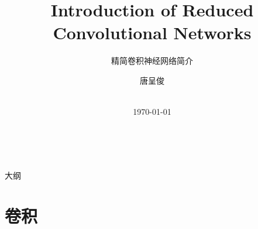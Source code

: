 \documentclass[UTF8, fontset=founder, aspectratio=43, 10pt, t]{ctexbeamer}
\begin{document}
	


\newcommand{\balA}[1][1]{BAL$^\mathup{I}_{#1:#1}$\xspace}
\newcommand{\unbalA}[1][n]{UNBAL$^\mathup{I}_{1:#1}$\xspace}
\newcommand{\balB}[1][1]{BAL$^\mathup{II}_{#1:#1}$\xspace}
\newcommand{\unbalB}[1][n]{UNBAL$^\mathup{II}_{#1:1}$\xspace}



\title{Introduction of Reduced Convolutional Networks}

\subtitle{精简卷积神经网络简介}

\author[唐呈俊]{%
	唐呈俊
} %


\date{%
	\\[\medskipamount]
	\textmd{\today}%
}






\begin{frame}[standout]{~}
	
	\titlepage%
	
\end{frame}


\begin{frame}[standout]{大纲}
	
	\medskip
	\tableofcontents
	
\end{frame}






\section{卷积}
\end{document}
